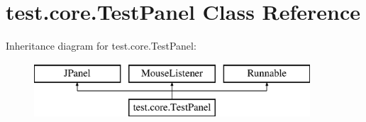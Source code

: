 \hypertarget{classtest_1_1core_1_1_test_panel}{\section{test.\-core.\-Test\-Panel Class Reference}
\label{classtest_1_1core_1_1_test_panel}
}
Inheritance diagram for test.\-core.\-Test\-Panel\-:\begin{figure}[H]
\begin{center}
\leavevmode
\includegraphics[height=2.000000cm]{classtest_1_1core_1_1_test_panel}
\end{center}
\end{figure}
